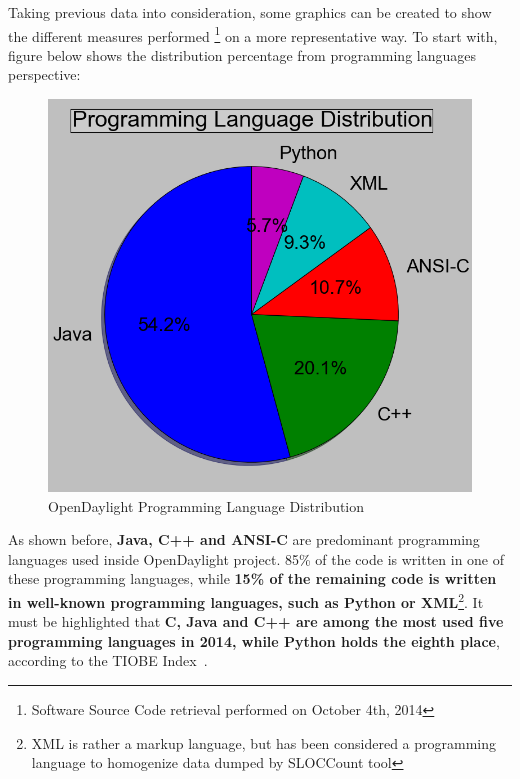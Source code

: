\documentclass[a4paper, 12pt]{book}
\begin{document}
Taking previous data into consideration, some graphics can be created to show the different measures performed \footnote{Software Source Code retrieval performed on October 4th, 2014} on a more representative way. To start with, figure below shows the distribution percentage from programming languages perspective:
\begin{center}
 \begin{figure}[H]
 \begin{center}
   \includegraphics[width=15cm]{img/sloc-distritbution-01.png}
   \caption{OpenDaylight Programming Language Distribution}
   \label{fig:odl_prog_dist_diagram}
 \end{center}
 \end{figure}
\end{center}
As shown before, \textbf{Java, C++ and ANSI-C} are predominant programming languages used inside OpenDaylight project. 85\% of the code is written in one of these programming languages, while \textbf{15\% of the remaining code is written in well-known programming languages, such as Python or XML}\footnote{XML is rather a markup language, but has been considered a programming language to homogenize data dumped by SLOCCount tool}. It must be highlighted that \textbf{C, Java and C++ are among the most used five programming languages in 2014, while Python holds the eighth place}, according to the TIOBE Index~\cite{TiobeIndex}.\\
\end{document}
